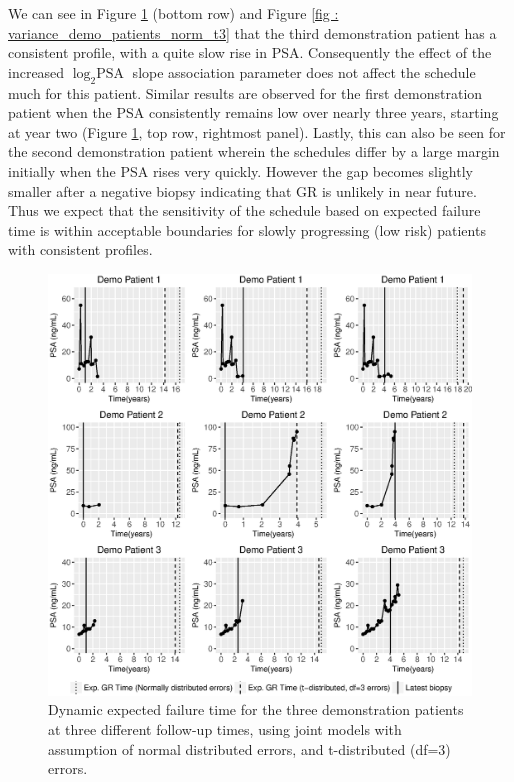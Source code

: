 \begin{enumerate}
	We can see in Figure \ref{fig : demo_expfail_norm_t3} (bottom row) and Figure \ref{fig : variance_demo_patients_norm_t3} that the third demonstration patient has a consistent profile, with a quite slow rise in PSA. Consequently the effect of the increased $\log_2 \mbox{PSA}$ slope association parameter does not affect the schedule much for this patient. Similar results are observed for the first demonstration patient when the PSA consistently remains low over nearly three years, starting at year two (Figure \ref{fig : demo_expfail_norm_t3}, top row, rightmost panel). Lastly, this can also be seen for the second demonstration patient wherein the schedules differ by a large margin initially when the PSA rises very quickly. However the gap becomes slightly smaller after a negative biopsy indicating that GR is unlikely in near future. Thus we expect that the sensitivity of the schedule based on expected failure time is within acceptable boundaries for slowly progressing (low risk) patients with consistent profiles.

	\begin{figure}[!htb]
	\centerline{\includegraphics[width=\columnwidth]{images/model_fit/demo_expfail_norm_t3.eps}}
	\caption{Dynamic expected failure time for the three demonstration patients at three different follow-up times, using joint models with assumption of normal distributed errors, and t-distributed (df=3) errors.}
	\label{fig : demo_expfail_norm_t3}
	\end{figure}


\end{enumerate}
